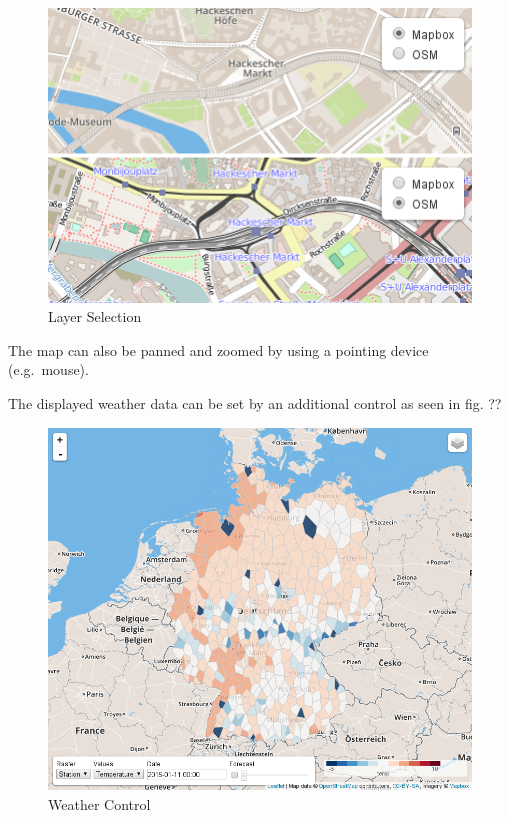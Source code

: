 \documentclass[paper=a4, fontsize=11pt]{scrartcl} %
\numberwithin{equation}{section} %
\numberwithin{figure}{section} %
\numberwithin{table}{section} %
\begin{document}
\begin{figure}[htbp]
\includegraphics[width=1\textwidth]{pictures/screenshot-baselayer.png}
\caption{Layer Selection}
\end{figure}

The map can also be panned and zoomed by using a pointing device
(e.g.~mouse).

The displayed weather data can be set by an additional control as seen
in fig. ??

\begin{figure}[htbp]
\includegraphics[width=1\textwidth]{pictures/screenshot-control.png}
\caption{Weather Control}
\end{figure}
\end{document}
